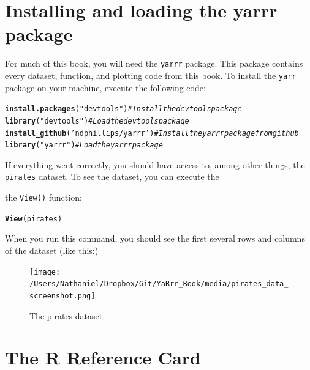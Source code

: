 \documentclass{tufte-book}\usepackage[]{graphicx}\usepackage[]{color}
\makeatletter
\newcommand{\hlstr}[1]{\textcolor[rgb]{0.192,0.494,0.8}{#1}}%
\newcommand{\hlcom}[1]{\textcolor[rgb]{0.678,0.584,0.686}{\textit{#1}}}%
\newcommand{\hlstd}[1]{\textcolor[rgb]{0.345,0.345,0.345}{#1}}%
\newcommand{\hlkwd}[1]{\textcolor[rgb]{0.737,0.353,0.396}{\textbf{#1}}}%
\newenvironment{kframe}{%
 \def\at@end@of@kframe{}%
 \ifinner\ifhmode%
  \def\at@end@of@kframe{\end{minipage}}%
  \begin{minipage}{\columnwidth}%
 \fi\fi%
 \def\FrameCommand##1{\hskip\@totalleftmargin \hskip-\fboxsep
 \colorbox{shadecolor}{##1}\hskip-\fboxsep
     \hskip-\linewidth \hskip-\@totalleftmargin \hskip\columnwidth}%
 \MakeFramed {\advance\hsize-\width
   \@totalleftmargin\z@ \linewidth\hsize
   \@setminipage}}%
 {\par\unskip\endMakeFramed%
 \at@end@of@kframe}
\newenvironment{knitrout}{}{} %
\makeatother
\begin{document}
\section{Installing and loading the yarrr package}

For much of this book, you will need the \texttt{yarrr} package. This package contains every dataset, function, and plotting code from this book. To install the \texttt{yarr} package on your machine, execute the following code:

\begin{knitrout}
\color{fgcolor}\begin{kframe}
\begin{alltt}
\hlkwd{install.packages}\hlstd{(}\hlstr{"devtools"}\hlstd{)} \hlcom{# Install the devtools package}
\hlkwd{library}\hlstd{(}\hlstr{"devtools"}\hlstd{)} \hlcom{# Load the devtools package}
\hlkwd{install_github}\hlstd{(}\hlstr{'ndphillips/yarrr'}\hlstd{)} \hlcom{# Install the yarrr package from github}
\hlkwd{library}\hlstd{(}\hlstr{"yarrr"}\hlstd{)} \hlcom{# Load the yarrr package}
\end{alltt}
\end{kframe}
\end{knitrout}





If everything went correctly, you should have access to, among other things, the \texttt{pirates} dataset. To see the dataset, you can execute the 

the \texttt{View()} function:

\begin{knitrout}
\color{fgcolor}\begin{kframe}
\begin{alltt}
\hlkwd{View}\hlstd{(pirates)}
\end{alltt}
\end{kframe}
\end{knitrout}

When you run this command, you should see the first several rows and columns of the dataset (like this:)

\begin{figure}
\texttt{[image: /Users/Nathaniel/Dropbox/Git/YaRrr\_Book/media/pirates\_data\_screenshot.png]}
\caption{The pirates dataset.}
\label{fig:piratesdata}
\end{figure}


\section{The R Reference Card}
\end{document}
